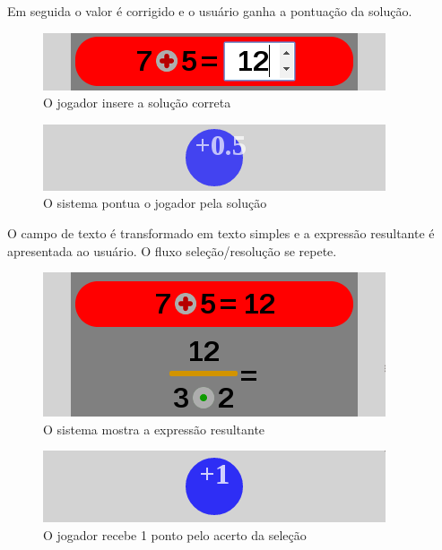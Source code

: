 Em seguida o valor é corrigido e o usuário ganha a pontuação da solução.

\begin{figure}[H]
	\caption{\label{xp_4}O jogador insere a solução correta}
	\begin{center}
	    \includegraphics[scale=1]{xp_4_4_rightans_1.png}
	\end{center}
\end{figure}

\begin{figure}[H]
	\caption{\label{score_0_5_2}O sistema pontua o jogador pela solução}
	\begin{center}
	    \includegraphics[scale=1]{score_0_5.png}
	\end{center}
\end{figure}

O campo de texto é transformado em texto simples e a expressão resultante é apresentada ao usuário. O fluxo seleção/resolução se repete.

\begin{figure}[H]
	\caption{\label{xp_5}O sistema mostra a expressão resultante}
	\begin{center}
	    \includegraphics[scale=1]{xp_4_5.png}
	\end{center}
\end{figure}

\begin{figure}[H]
	\caption{\label{score_1_1}O jogador recebe 1 ponto pelo acerto da seleção}
	\begin{center}
	    \includegraphics[scale=1]{score_1.png}
	\end{center}
\end{figure}

